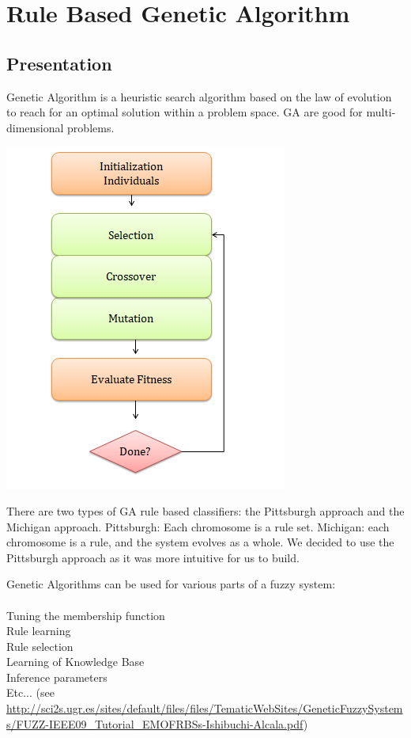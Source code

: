 \documentclass[a4paper,12pt]{article}
\begin{document}
\section{Rule Based Genetic Algorithm}

\subsection{Presentation}

Genetic Algorithm is a heuristic search algorithm based on the law of evolution to reach for an optimal solution within a problem space. GA are good for multi-dimensional problems.

\begin{center}
\includegraphics[scale=0.5]{genealgo}
\end{center}

There are two types of GA rule based classifiers: the Pittsburgh approach and the Michigan approach. Pittsburgh: Each chromosome is a rule set. Michigan: each chromosome is a rule, and the system evolves as a whole. We decided to use the Pittsburgh approach as it was more intuitive for us to build.


Genetic Algorithms can be used for various parts of a fuzzy system:\\
\\
Tuning the membership function\\
Rule learning\\
Rule selection\\
Learning of Knowledge Base\\
Inference parameters\\
Etc... (see \url{http://sci2s.ugr.es/sites/default/files/files/TematicWebSites/GeneticFuzzySystems/FUZZ-IEEE09_Tutorial_EMOFRBSs-Ishibuchi-Alcala.pdf})
\end{document}
